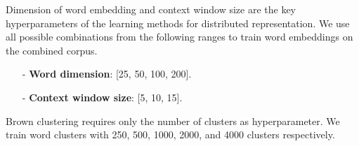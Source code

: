 Dimension of word embedding and context window size are the key hyperparameters of the learning methods for distributed representation. We use all possible combinations from the following ranges to train word embeddings on the combined corpus.
\begin{small}
\begin{itemize}
\item[-]\textbf{Word dimension}: [25, 50, 100, 200].
\item[-]\textbf{Context window size}: [5, 10, 15].
\end{itemize}
\end{small}
Brown clustering requires only the number of clusters as hyperparameter. We train word clusters with 250, 500, 1000, 2000, and 4000 clusters respectively. 
%
%
%
%
%
% 
%
